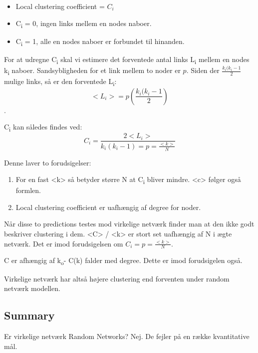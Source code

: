 \documentclass[11pt]{article}
\begin{document}
\begin{itemize}
\item Local clustering coefficient = \(C_i\)
\item C\textsubscript{i} = 0, ingen links mellem en nodes naboer.
\item C\textsubscript{i} = 1, alle en nodes naboer er forbundet til hinanden.
\end{itemize}

For at udregne C\textsubscript{i} skal vi estimere det forventede antal links L\textsubscript{i} mellem en nodes k\textsubscript{i} naboer. Sandsybligheden for et link mellem to noder er \(p\). Siden der \(\frac{k_i(k_i - 1}{2}\) mulige links, så er den forventede L\textsubscript{i}: $$ <L_i> = p(\frac{k_i(k_i - 1}{2}) $$.

C\textsubscript{i} kan således findes ved: $$ C_i = \frac{2 <L_i>}{k_i (k_i - 1) = p = \frac{<k>}{N}} $$

Denne laver to forudsigelser: 
\begin{enumerate}
\item For en fast <k> så betyder større N at C\textsubscript{i} bliver mindre. <c> følger også formlen.
\item Local clustering coefficient er uafhængig af degree for noder.
\end{enumerate}

Når disse to predictions testes mod virkelige netværk finder man at den ikke godt beskriver clustering i dem. <C> / <k> er stort set uafhængig af N i ægte netværk. Det er imod forudsigelsen om \(C_i = p = \frac{<k>}{N}\).

C er afhængig af k\textsubscript{o}- C(k) falder med degree. Dette er imod forudsigelen også.

Virkelige netværk har altså højere clustering end forventen under random netværk modellen.

\subsection{Summary}
\label{sec:orgcfe2668}
Er virkelige netværk Random Networks? Nej. De fejler på en række kvantitative mål. 
\end{document}
